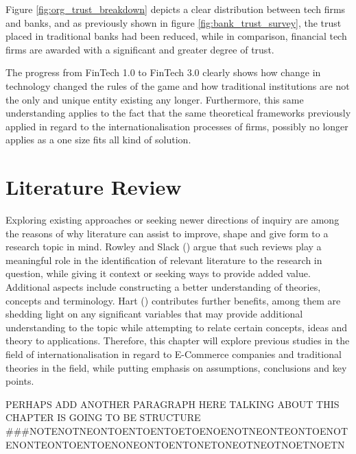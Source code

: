 \documentclass[12pt,a4paper]{article}
\begin{document}
Figure \ref{fig:org_trust_breakdown} depicts a clear distribution between tech firms and banks, and as previously shown in figure \ref{fig:bank_trust_survey}, the trust placed in traditional banks had been reduced, while in comparison, financial tech firms are awarded with a significant and greater degree of trust. \par
The progress from FinTech 1.0 to FinTech 3.0 clearly shows how change in technology changed the rules of the game and how traditional institutions are not the only and unique entity existing any longer. Furthermore, this same understanding applies to the fact that the same theoretical frameworks previously applied in regard to the internationalisation processes of firms, possibly no longer applies as a one size fits all kind of solution. 







\section{Literature Review}
\label{lit_review}
  \vspace{-5mm}
Exploring existing approaches or seeking newer directions of inquiry are among the reasons of why  literature can assist to improve, shape and give form to a research topic in mind. Rowley and Slack (\citeyear{rowleyConductingLiteratureReview2004}) argue that such reviews play a meaningful role in the identification of relevant literature to the research in question, while giving it context or seeking ways to provide added value. Additional aspects include constructing a better understanding of theories, concepts and terminology. Hart (\citeyear{hartDoingLiteratureReview1998}) contributes further benefits, among them are shedding light on any significant variables that may provide additional understanding to the topic while attempting to relate certain concepts, ideas and theory to applications. Therefore, this chapter will explore previous studies in the field of internationalisation in regard to E-Commerce companies and traditional theories  in the field, while putting emphasis on assumptions, conclusions and key points. \par
PERHAPS ADD ANOTHER PARAGRAPH HERE TALKING ABOUT THIS CHAPTER IS GOING TO BE STRUCTURE ###NOTENOTNEONTOENTOENTOETOENOENOTNEONTEONTOENOTENONTEONTOENTOENONEONTOENTONETONEOTNEOTNOETNOETN
\end{document}
